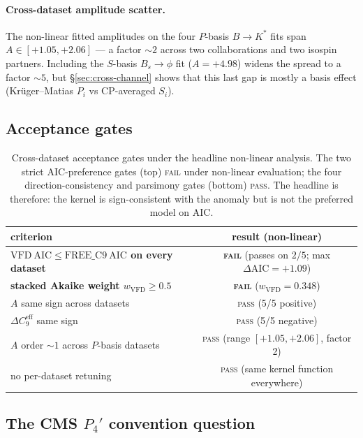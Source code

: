 \paragraph{Cross-dataset amplitude scatter.} The non-linear fitted
amplitudes on the four $P$-basis $B\to K^{*}$ fits span
$A\in[+1.05,+2.06]$ — a factor $\sim 2$ across two collaborations
and two isospin partners. Including the $S$-basis $B_{s}\!\to\!\phi$
fit ($A=+4.98$) widens the spread to a factor $\sim 5$, but
\S\ref{sec:cross-channel} shows that this last gap is mostly a
basis effect (Krüger--Matias $P_{i}$ vs CP-averaged $S_{i}$).

\subsection{Acceptance gates}

\begin{table}[h]
\centering
\small
\begin{tabular}{lc}
\toprule
criterion & result (non-linear) \\
\midrule
\textbf{$\mathrm{VFD\ AIC} \leq \mathrm{FREE\_C9\ AIC}$ on every dataset}
   & \textbf{\textsc{fail}} (passes on $2/5$; max $\Delta\mathrm{AIC}=+1.09$) \\
\textbf{stacked Akaike weight $w_{\mathrm{VFD}} \geq 0.5$}
   & \textbf{\textsc{fail}} ($w_{\mathrm{VFD}} = 0.348$) \\
\midrule
$A$ same sign across datasets & \textsc{pass} (5/5 positive) \\
$\Delta C_{9}^{\mathrm{eff}}$ same sign & \textsc{pass} (5/5 negative) \\
$A$ order $\sim 1$ across $P$-basis datasets & \textsc{pass} (range $[+1.05,+2.06]$, factor 2) \\
no per-dataset retuning & \textsc{pass} (same kernel function everywhere) \\
\bottomrule
\end{tabular}
\caption{Cross-dataset acceptance gates under the headline non-linear
analysis. The two strict AIC-preference gates (top) \textsc{fail}
under non-linear evaluation; the four direction-consistency and
parsimony gates (bottom) \textsc{pass}. The headline is therefore:
the kernel is sign-consistent with the anomaly but is not the
preferred model on AIC.}
\end{table}

\subsection{The CMS $P_{4}'$ convention question}

